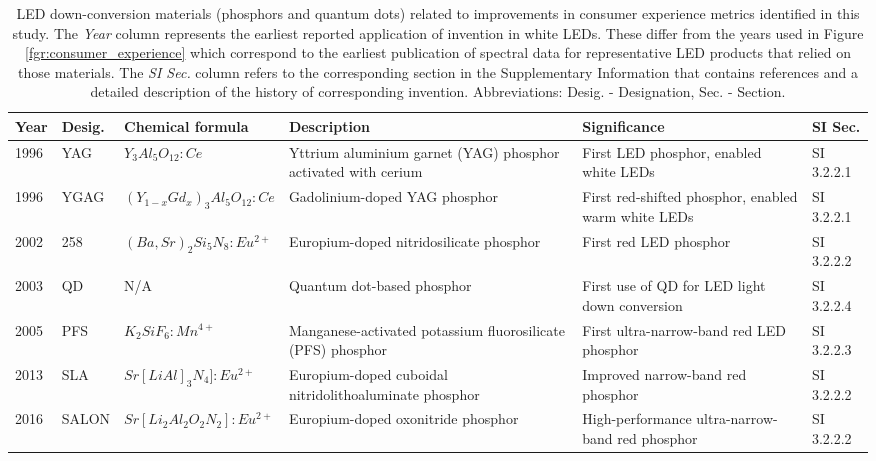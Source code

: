 \documentclass[journal=jacsat,manuscript=article]{achemso}
\begin{document}
\begin{table}[h!]
    \footnotesize
    \centering
    \begin{tabularx}{\textwidth}{|l|l|l|X|X|l|}
    \hline
        \textbf{Year} & \textbf{Desig.} & \textbf{Chemical formula} & \textbf{Description} & \textbf{Significance} & \textbf{SI Sec.} \\ \hline
        1996 & YAG & $Y_3 Al_5 O_{12}:Ce$ & Yttrium aluminium garnet (YAG) phosphor activated with cerium & First LED phosphor, enabled white LEDs & SI 3.2.2.1 \\ \hline
        1996 & YGAG & $(Y_{1-x} Gd_x)_3 Al_5 O_{12}:Ce$ & Gadolinium-doped YAG phosphor & First red-shifted phosphor, enabled warm white LEDs & SI 3.2.2.1 \\ \hline
        2002 & 258 & $(Ba,Sr)_2 Si_5 N_8:Eu^{2+}$ & Europium-doped nitridosilicate phosphor & First red LED phosphor & SI 3.2.2.2 \\ \hline
        2003 & QD & N/A & Quantum dot-based phosphor & First use of QD for LED light down conversion & SI 3.2.2.4 \\ \hline
        2005 & PFS & $K_2 SiF_6: Mn^{4+}$ & Manganese-activated potassium fluorosilicate (PFS) phosphor & First ultra-narrow-band red LED phosphor & SI 3.2.2.3 \\ \hline
        2013 & SLA & $Sr[Li Al]_3 N_4 ]:Eu^{2+}$ & Europium-doped cuboidal nitridolithoaluminate phosphor & Improved narrow-band red phosphor & SI 3.2.2.2 \\ \hline
        2016 & SALON & $Sr[Li_2 Al_2 O_2 N_2]:Eu^{2+}$ & Europium-doped oxonitride phosphor & High-performance ultra-narrow-band red phosphor & SI 3.2.2.2 \\ \hline
    \end{tabularx}
    \caption{LED down-conversion materials (phosphors and quantum dots) related to improvements in consumer experience metrics identified in this study. The \textit{Year} column represents the earliest reported application of invention in white LEDs. These differ from the years used in Figure \ref{fgr:consumer_experience} which correspond to the earliest publication of spectral data for representative LED products that relied on those materials. The \textit{SI Sec.} column refers to the corresponding section in the Supplementary Information that contains references and a detailed description of the history of corresponding invention. Abbreviations: Desig. - Designation, Sec. - Section.}
    \label{tab:phosphors}
\end{table}
\end{document}
